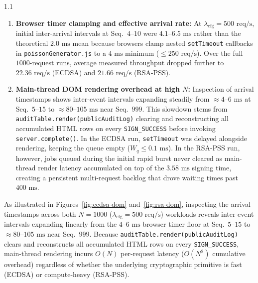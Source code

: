 \documentclass[11pt,a4paper]{article}
\begin{document}
\begin{spacing}{1.1}
\begin{enumerate}
    \item \textbf{Browser timer clamping and effective arrival rate:} At $\lambda_{\text{cfg}} = 500\text{ req/s}$, initial inter-arrival intervals at Seq.\ $4\text{--}10$ were $4.1\text{--}6.5\text{ ms}$ rather than the theoretical $2.0\text{ ms}$ mean because browsers clamp nested \texttt{setTimeout} callbacks in \texttt{poissonGenerator.js} to a $4\text{ ms}$ minimum ($\le 250\text{ req/s}$). Over the full $1000$-request runs, average measured throughput dropped further to $22.36\text{ req/s}$ (ECDSA) and $21.66\text{ req/s}$ (RSA-PSS).

    \item \textbf{Main-thread DOM rendering overhead at high $N$:} Inspection of arrival timestamps shows inter-event intervals expanding steadily from $\approx 4\text{--}6\text{ ms}$ at Seq.\ $5\text{--}15$ to $\approx 80\text{--}105\text{ ms}$ near Seq.\ $999$. This slowdown stems from \texttt{auditTable.render(publicAuditLog)} clearing and reconstructing all accumulated HTML rows on every \texttt{SIGN\_SUCCESS} before invoking \texttt{server.complete()}. In the ECDSA run, \texttt{setTimeout} was delayed alongside rendering, keeping the queue empty ($W_q \le 0.1\text{ ms}$). In the RSA-PSS run, however, jobs queued during the initial rapid burst never cleared as main-thread render latency accumulated on top of the $3.58\text{ ms}$ signing time, creating a persistent multi-request backlog that drove waiting times past $400\text{ ms}$.
\end{enumerate}

\noindent
As illustrated in Figures~\ref{fig:ecdsa-dom} and~\ref{fig:rsa-dom}, inspecting the arrival timestamps across both $N = 1000$ ($\lambda_{\text{cfg}} = 500\text{ req/s}$) workloads reveals inter-event intervals expanding linearly from the $4\text{--}6\text{ ms}$ browser timer floor at Seq.\ $5\text{--}15$ to $\approx 80\text{--}105\text{ ms}$ near Seq.\ $999$. 
Because \texttt{auditTable.render(publicAuditLog)} clears and reconstructs all accumulated HTML rows on every \texttt{SIGN\_SUCCESS}, main-thread rendering incurs $O(N)$ per-request latency ($O(N^2)$ cumulative overhead) regardless of whether the underlying cryptographic primitive is fast (ECDSA) or compute-heavy (RSA-PSS).


\end{spacing}
\end{document}
